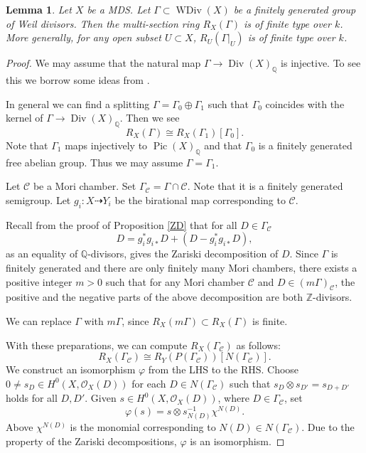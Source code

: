 \documentclass[12pt,twoside]{amsart}
\newtheorem{lem}[theo]{Lemma}
\theoremstyle{definition}
\newcommand\Pic{\mathop{\mathrm{Pic}}\nolimits}
\newcommand\Divi{\mathop{\mathrm{Div}}\nolimits}
\newcommand\WDivi{\mathop{\mathrm{WDiv}}\nolimits}
\newcommand\bz{\mathbb{Z}}
\newcommand\bq{\mathbb{Q}}
\begin{document}
\begin{lem}\label{afs}
Let $X$ be a MDS. Let $\Gamma\subset\WDivi{(X)}$ be a finitely generated group of Weil divisors.
Then the multi-section ring $R_X(\Gamma)$ is of finite type over $k$.
More generally, for any open subset $U\subset X$, $R_{U}(\Gamma|_{U})$ is of finite type over $k$.
\end{lem}
\begin{proof}
We may assume that the natural map $\Gamma\to\Divi{(X)}_{\bq}$ is injective. To see this
we borrow some ideas from \cite{b}.

In general we can find a splitting $\Gamma=\Gamma_0\oplus\Gamma_1$ such that $\Gamma_0$
coincides with the kernel of $\Gamma\to\Divi{(X)}_{\bq}$. Then we see
\begin{equation*}
R_{X}(\Gamma)\cong R_{X}(\Gamma_{1})[\Gamma_{0}].
\end{equation*}
Note that $\Gamma_{1}$ maps injectively to $\Pic{(X)}_{\bq}$ and that $\Gamma_{0}$ is a finitely generated
free abelian group. Thus we may assume $\Gamma=\Gamma_1$.

Let $\mathcal{C}$ be a Mori chamber.
Set $\Gamma_{\mathcal{C}}=\Gamma\cap \mathcal{C}$. Note that it is a finitely generated semigroup.
Let $g_i:X\dasharrow Y_i$ be the birational map corresponding to $\mathcal{C}$.

Recall from the proof of Proposition \ref{ZD} that for all $D\in\Gamma_{\mathcal{C}}$
\begin{equation*}
D=g_i^{*}g_{i*}D+(D-g_i^{*}g_{i*}D),
\end{equation*}
as an equality of $\bq$-divisors, gives the Zariski decomposition of $D$.
Since $\Gamma$ is finitely generated and there are only finitely many Mori chambers,
there exists a positive integer $m>0$ such that
for any Mori chamber $\mathcal{C}$ and $D\in (m\Gamma)_{\mathcal{C}}$,
the positive and the negative parts of the above decomposition are both $\bz$-divisors.

We can replace $\Gamma$ with $m\Gamma$, since
$R_{X}(m\Gamma)\subset R_{X}(\Gamma)$ is finite.


With these preparations, we can compute $R_X(\Gamma_{\mathcal{C}})$ as follows:
\begin{equation*}
R_X(\Gamma_{\mathcal{C}})\cong R_{Y}(P(\Gamma_{\mathcal{C}}))[N(\Gamma_{\mathcal{C}})].
\end{equation*}
We construct an isomorphism $\varphi$ from the LHS to the RHS.
Choose $0\not=s_D\in H^0(X,\mathcal{O}_X(D))$ for each $D\in N(\Gamma_\mathcal{C})$
such that $s_D\otimes s_{D'}=s_{D+D'}$ holds for all $D,D'$.
Given $s\in H^0(X,\mathcal{O}_X(D))$, where $D\in\Gamma_\mathcal{C}$, set
\begin{equation*}
\varphi{(s)}=s\otimes s_{N(D)}^{-1}\chi^{N(D)}.
\end{equation*}
Above $\chi^{N(D)}$ is the monomial corresponding to $N(D)\in N(\Gamma_\mathcal{C})$.
Due to the property of the Zariski decompositions,
$\varphi$ is an isomorphism.


\end{proof}
\end{document}
